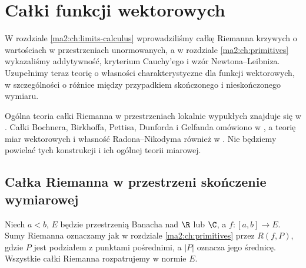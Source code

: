 \chapter{Całki funkcji wektorowych}
\label{ma2:ch:vector-integrals}

W rozdziale \ref{ma2:ch:limits-calculus}
wprowadziliśmy całkę Riemanna krzywych o wartościach
w przestrzeniach unormowanych, a w rozdziale
\ref{ma2:ch:primitives} wykazaliśmy addytywność,
kryterium Cauchy'ego i wzór Newtona--Leibniza.
Uzupełnimy teraz teorię o własności charakterystyczne
dla funkcji wektorowych, w szczególności o różnice
między przypadkiem skończonego i nieskończonego
wymiaru.

Ogólna teoria całki Riemanna w przestrzeniach
lokalnie wypukłych znajduje się w
.
Całki Bochnera, Birkhoffa, Pettisa, Dunforda
i Gelfanda omówiono w
,
a teorię miar wektorowych i własność
Radona--Nikodyma również w
.
Nie będziemy powielać tych konstrukcji i ich
ogólnej teorii miarowej.

\section{Całka Riemanna w przestrzeni skończenie wymiarowej}

Niech $a<b$, $E$ będzie przestrzenią Banacha
nad $\R$ lub $\C$, a $f:[a,b]\to E$.
Sumy Riemanna oznaczamy jak w rozdziale
\ref{ma2:ch:primitives} przez $R(f,P)$,
gdzie $P$ jest podziałem z punktami pośrednimi,
a $|P|$ oznacza jego średnicę.
Wszystkie całki Riemanna rozpatrujemy w normie $E$.

